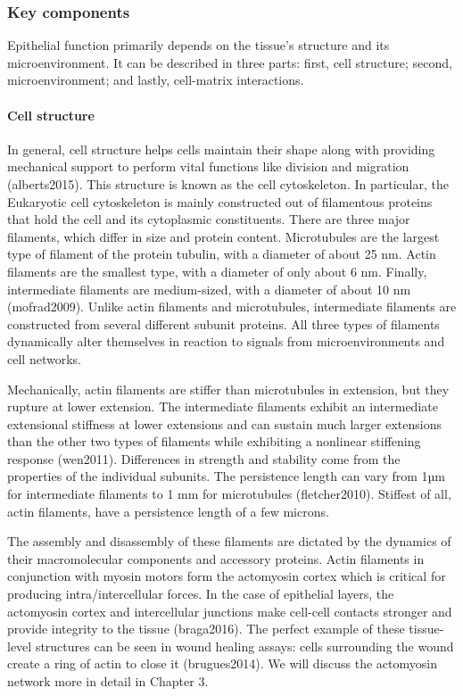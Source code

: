 \documentclass[
]{article}
\begin{document}
\hypertarget{key-components}{%
\subsubsection{Key components}\label{key-components}}

Epithelial function primarily depends on the tissue's structure and its
microenvironment. It can be described in three parts: first, cell
structure; second, microenvironment; and lastly, cell-matrix
interactions.

\hypertarget{cell-structure}{%
\paragraph{Cell structure}\label{cell-structure}}

In general, cell structure helps cells maintain their shape along with
providing mechanical support to perform vital functions like division
and migration (alberts2015). This structure is known as the cell
cytoskeleton. In particular, the Eukaryotic cell cytoskeleton is mainly
constructed out of filamentous proteins that hold the cell and its
cytoplasmic constituents. There are three major filaments, which differ
in size and protein content. Microtubules are the largest type of
filament of the protein tubulin, with a diameter of about 25 nm. Actin
filaments are the smallest type, with a diameter of only about 6 nm.
Finally, intermediate filaments are medium-sized, with a diameter of
about 10 nm (mofrad2009). Unlike actin filaments and microtubules,
intermediate filaments are constructed from several different subunit
proteins. All three types of filaments dynamically alter themselves in
reaction to signals from microenvironments and cell networks.

Mechanically, actin filaments are stiffer than microtubules in
extension, but they rupture at lower extension. The intermediate
filaments exhibit an intermediate extensional stiffness at lower
extensions and can sustain much larger extensions than the other two
types of filaments while exhibiting a nonlinear stiffening response
(wen2011). Differences in strength and stability come from the
properties of the individual subunits. The persistence length can vary
from 1µm for intermediate filaments to 1 mm for microtubules
(fletcher2010). Stiffest of all, actin filaments, have a persistence
length of a few microns.

The assembly and disassembly of these filaments are dictated by the
dynamics of their macromolecular components and accessory proteins.
Actin filaments in conjunction with myosin motors form the actomyosin
cortex which is critical for producing intra/intercellular forces. In
the case of epithelial layers, the actomyosin cortex and intercellular
junctions make cell-cell contacts stronger and provide integrity to the
tissue (braga2016). The perfect example of these tissue-level structures
can be seen in wound healing assays: cells surrounding the wound create
a ring of actin to close it (brugues2014). We will discuss the
actomyosin network more in detail in Chapter 3.
\end{document}
